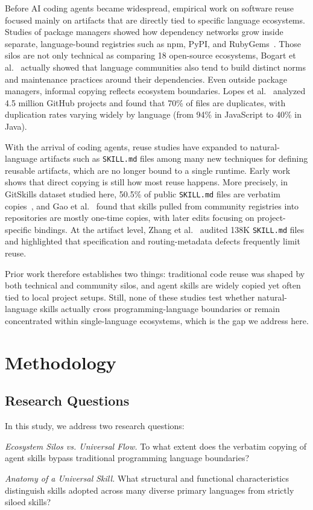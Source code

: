 Before AI coding agents became widespread, empirical work on software reuse focused mainly on artifacts that are directly tied to specific language ecosystems. Studies of package managers showed how dependency networks grow inside separate, language-bound registries such as npm, PyPI, and RubyGems~\cite{decan2019empirical}. Those silos are not only technical as comparing 18 open-source ecosystems, Bogart et al.~\cite{bogart2021breaking} actually showed that language communities also tend to build distinct norms and maintenance practices around their dependencies. Even outside package managers, informal copying reflects ecosystem boundaries. Lopes et al.~\cite{lopes2017dejavu} analyzed 4.5 million GitHub projects and found that 70\% of files are duplicates, with duplication rates varying widely by language (from 94\% in JavaScript to 40\% in Java).

With the arrival of coding agents, reuse studies have expanded to natural-language artifacts such as \texttt{SKILL.md} files among many new techniques for defining reusable artifacts, which are no longer bound to a single runtime. Early work shows that direct copying is still how most reuse happens. More precisely, in GitSkills dataset studied here, 50.5\% of public \texttt{SKILL.md} files are verbatim copies~\cite{destefanis2027gitskills}, and Gao et al.~\cite{gao2026registry} found that skills pulled from community registries into repositories are mostly one-time copies, with later edits focusing on project-specific bindings. At the artifact level, Zhang et al.~\cite{zhang2026keeps} audited 138K \texttt{SKILL.md} files and highlighted that specification and routing-metadata defects frequently limit reuse.

Prior work therefore establishes two things: traditional code reuse was shaped by both technical and community silos, and agent skills are widely copied yet often tied to local project setups. Still, none of these studies test whether natural-language skills actually cross programming-language boundaries or remain concentrated within single-language ecosystems, which is the gap we address here.

\section{Methodology}\label{sec:methodology}

\subsection{Research Questions}
In this study, we address two research questions:
\begin{description}[\IEEEsetlabelwidth{RQ2:}]
    \item[RQ1:] \textit{Ecosystem Silos vs. Universal Flow.} To what extent does the verbatim copying of agent skills bypass traditional programming language boundaries?
    \item[RQ2:] \textit{Anatomy of a Universal Skill.} What structural and functional characteristics distinguish skills adopted across many diverse primary languages from strictly siloed skills?
\end{description}

